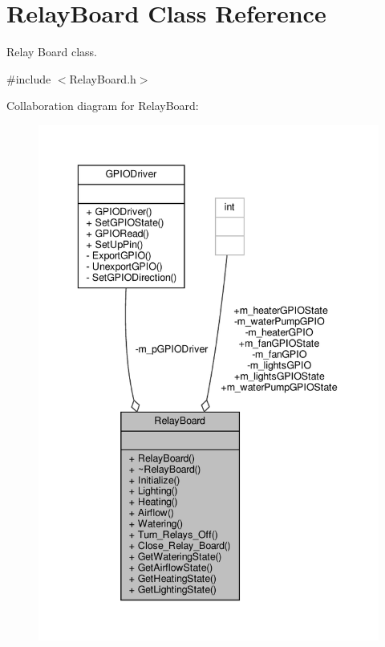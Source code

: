 \hypertarget{classRelayBoard}{}\section{Relay\+Board Class Reference}
\label{classRelayBoard}


Relay Board class.  




{\ttfamily \#include $<$Relay\+Board.\+h$>$}



Collaboration diagram for Relay\+Board\+:\nopagebreak
\begin{figure}[H]
\begin{center}
\leavevmode
\includegraphics[width=342pt]{classRelayBoard__coll__graph}
\end{center}
\end{figure}

